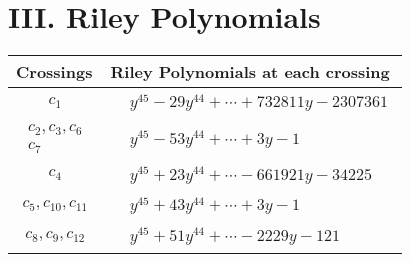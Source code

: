 \documentclass[1p]{elsarticle_modified}
\theoremstyle{definition}
\begin{document}
\centering \section*{ III. Riley Polynomials}
\begin{tabular}{m{50pt}|m{274pt}}
Crossings & \hspace{64pt}Riley Polynomials at each crossing \\
\hline $$\begin{aligned}c_{1}\end{aligned}$$&$\begin{aligned}
&y^{45}-29 y^{44}+\cdots+732811 y-2307361
\end{aligned}$\\
\hline $$\begin{aligned}c_{2},c_{3},c_{6}\\c_{7}\end{aligned}$$&$\begin{aligned}
&y^{45}-53 y^{44}+\cdots+3 y-1
\end{aligned}$\\
\hline $$\begin{aligned}c_{4}\end{aligned}$$&$\begin{aligned}
&y^{45}+23 y^{44}+\cdots-661921 y-34225
\end{aligned}$\\
\hline $$\begin{aligned}c_{5},c_{10},c_{11}\end{aligned}$$&$\begin{aligned}
&y^{45}+43 y^{44}+\cdots+3 y-1
\end{aligned}$\\
\hline $$\begin{aligned}c_{8},c_{9},c_{12}\end{aligned}$$&$\begin{aligned}
&y^{45}+51 y^{44}+\cdots-2229 y-121
\end{aligned}$\\
\hline
\end{tabular}
\vskip 2pc
\end{document}

